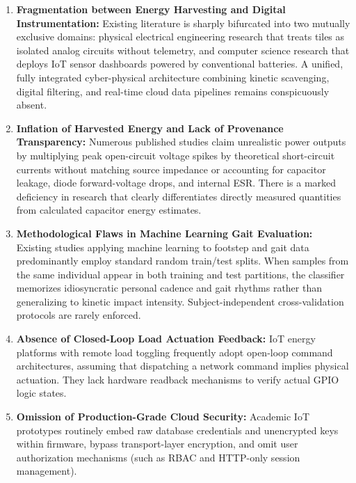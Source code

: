 \begin{enumerate}
    \item \textbf{Fragmentation between Energy Harvesting and Digital Instrumentation:} Existing literature is sharply bifurcated into two mutually exclusive domains: physical electrical engineering research that treats tiles as isolated analog circuits without telemetry, and computer science research that deploys IoT sensor dashboards powered by conventional batteries. A unified, fully integrated cyber-physical architecture combining kinetic scavenging, digital filtering, and real-time cloud data pipelines remains conspicuously absent.
    \item \textbf{Inflation of Harvested Energy and Lack of Provenance Transparency:} Numerous published studies claim unrealistic power outputs by multiplying peak open-circuit voltage spikes by theoretical short-circuit currents without matching source impedance or accounting for capacitor leakage, diode forward-voltage drops, and internal ESR. There is a marked deficiency in research that clearly differentiates directly measured quantities from calculated capacitor energy estimates.
    \item \textbf{Methodological Flaws in Machine Learning Gait Evaluation:} Existing studies applying machine learning to footstep and gait data predominantly employ standard random train/test splits. When samples from the same individual appear in both training and test partitions, the classifier memorizes idiosyncratic personal cadence and gait rhythms rather than generalizing to kinetic impact intensity. Subject-independent cross-validation protocols are rarely enforced.
    \item \textbf{Absence of Closed-Loop Load Actuation Feedback:} IoT energy platforms with remote load toggling frequently adopt open-loop command architectures, assuming that dispatching a network command implies physical actuation. They lack hardware readback mechanisms to verify actual GPIO logic states.
    \item \textbf{Omission of Production-Grade Cloud Security:} Academic IoT prototypes routinely embed raw database credentials and unencrypted keys within firmware, bypass transport-layer encryption, and omit user authorization mechanisms (such as RBAC and HTTP-only session management).
\end{enumerate}

